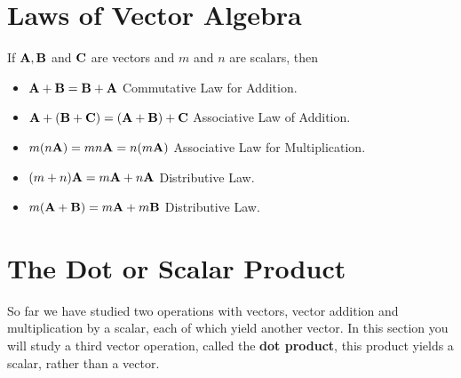 \documentclass[titlepage,a4paper,12pt]{report}
\begin{document}
\section{Laws of Vector Algebra}
If $\bf{A}, \bf{B}$ and $\bf{C}$ are vectors and $m$ and $n$ are scalars, then
\begin{itemize}
\item[(i)] $\bf{A}+\bf{B}=\bf{B}+\bf{A}$ \quad \quad \quad \quad \quad \quad  Commutative Law for Addition.
\item[(ii)] $\bf{A}+(\bf{B}+\bf{C})=(\bf{A}+\bf{B})+\bf{C}$ \quad Associative Law of Addition.
\item[(iii)] $m(n{\bf{A}})=mn{\bf{A}}=n(m{\bf{A}})$ \quad \quad Associative Law for Multiplication.
\item[(iv)] $(m+n){\bf{A}}=m{\bf{A}}+n{\bf{A}}$ \quad \quad Distributive Law.
\item[(v)] $m({\bf{A}}+{\bf{B}})=m{\bf{A}}+m{\bf{B}}$ \quad \quad Distributive Law.
\end{itemize}
\section{The Dot or Scalar Product}
So far we have studied two operations with vectors, vector addition and multiplication by a scalar, each of which yield another vector. In this section you will study a third vector operation, called the \textbf{dot product}, this product yields a scalar, rather than a vector.
\end{document}
